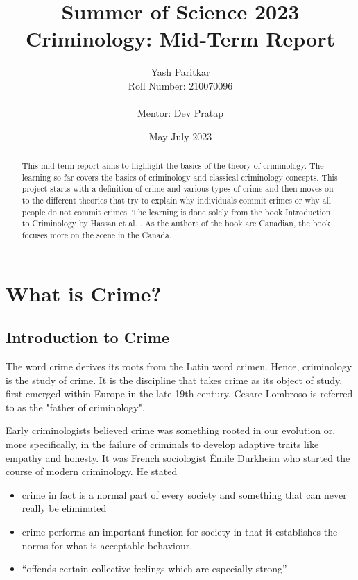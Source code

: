\documentclass[11pt]{article}
\title{Summer of Science 2023\\
\textbf{Criminology: Mid-Term Report}}
\author{Yash Paritkar\\
Roll Number: 210070096\\
\\
Mentor: Dev Pratap}
\date{May-July 2023}
\begin{document}
\maketitle

\newpage

\begin{abstract}
    This mid-term report aims to highlight the basics of the theory of criminology. The learning so far covers the basics of criminology and classical criminology concepts. This project starts with a definition of crime and various types of crime and then moves on to the different theories that try to explain why individuals commit crimes or why all people do not commit crimes. The learning is done solely from the book Introduction to Criminology by Hassan et al. \cite{ref: Introduction to Criminology}. As the authors of the book are Canadian, the book focuses more on the scene in the Canada.
\end{abstract}

\tableofcontents

\newpage

\section{What is Crime?}

\subsection{Introduction to Crime}
The word crime derives its roots from the Latin word crimen. Hence, criminology is the study of crime. It is the discipline that takes crime as its object of study, first emerged within Europe in the late 19th century. Cesare Lombroso is referred to as the "father of criminology".

Early criminologists believed crime was something rooted in our evolution or, more specifically, in the failure of criminals to develop adaptive traits like empathy and honesty. It was French sociologist Émile Durkheim who started the course of modern criminology. He stated

\begin{itemize}
    \item crime in fact is a normal part of every society and something that can never really be eliminated
    \item crime performs an important function for society in that it establishes the norms for what is acceptable behaviour.
    \item “offends certain collective feelings which are especially strong”
\end{itemize}
\end{document}
